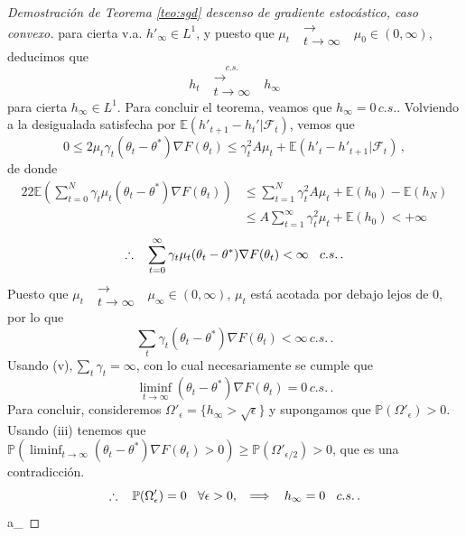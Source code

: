 \documentclass[letterpaper,11pt]{article} %
\def\espacio{\hspace{.25cm}\,}
\theoremstyle{defbreak}
\theoremstyle{propbreak}
\theoremstyle{remark}
\theoremstyle{break}
\def\E{\mathbb{E}}
\def\P{\mathbb{P}}
\def\convt{\mbox{ }\substack{\longrightarrow \\ t\to\infty}\mbox{ }}
\def\negro{\color{black}}
\def\findem{\null\hfill\color{white}a\color{black}_\square}
\begin{document}
\begin{proof}[Demostración de Teorema \ref{teo:sgd} descenso de gradiente estocástico, caso convexo]
para cierta v.a. $ h'_\infty\in L^1$, 
y puesto que $\mu_t \convt \mu_0\in(0,\infty)$, deducimos que $$h_t\mbox{ }\overset{c.s.}{\substack{\longrightarrow \\t \to \infty}}\mbox{ }h_\infty$$ para cierta $h_\infty\in L^1$. 
Para concluir el teorema,  veamos que $h_\infty=0\,c.s.$.  Volviendo a la desigualada satisfecha por $\E(h'_{t+1}-h_t'|\mathcal{F}_t)$, vemos que 
$$ 0\leq 2\mu_t \gamma_t(\theta_t-\theta^*)\nabla F(\theta_t)\leq \gamma_t^2A\mu_t + \E(h'_t-h'_{t+1}|\mathcal{F}_t) \,,$$
de donde
\begin{alignat*}{2}
 2\E(\displaystyle\sum^N_{t=0}\gamma_t\mu_t(\theta_t-\theta^*)\nabla F(\theta_t)) & \leq \displaystyle\sum^N_{t=1}\gamma_t^2 A\mu_t+\E(h_0)-\E(h_{N}) \\
& \leq A\sum^{\infty}_{t=1}\gamma_t^2\mu_t+\E(h_0)<+\infty
\end{alignat*}
$$ \therefore \espacio \displaystyle\sum^\infty_{t=0}\gamma_t\mu_t(\theta_t-\theta^*)\nabla F(\theta_t)<\infty \espacio c.s.\,.$$
Puesto que $\mu_t\convt\mu_\infty\in(0,\infty)$, $\mu_t$ est\'a acotada por debajo lejos de $0$, por lo que 
$$  \displaystyle\sum_t\gamma_t(\theta_t-\theta^*)\nabla F(\theta_t)<\infty \, c.s.\,.$$
Usando (v),\espacio $\displaystyle\sum_t\gamma_t=\infty$, con lo cual necesariamente se cumple que 
$$ \displaystyle\liminf_{t\to\infty}(\theta_t-\theta^*)\nabla F(\theta_t) = 0 \,c.s.\,.$$
Para concluir, consideremos $\Omega'_\epsilon=\{h_\infty>\sqrt{\epsilon}\}$ y supongamos que $\P(\Omega'_\epsilon)>0$. Usando (iii) tenemos que $\P(\displaystyle\liminf_{t\to\infty}(\theta_t-\theta^*)\nabla F(\theta_t)>0)\geq \P(\Omega'_{\epsilon/2})  >0$, que es una contradicción. 
$$ \therefore\espacio \P(\Omega'_\epsilon)=0\espacio\forall\epsilon>0,\espacio \Longrightarrow\espacio h_\infty=0\espacio c.s.\,. $$ \findem
\negro
\end{proof}
\vspace{1cm}\\
\end{document}

